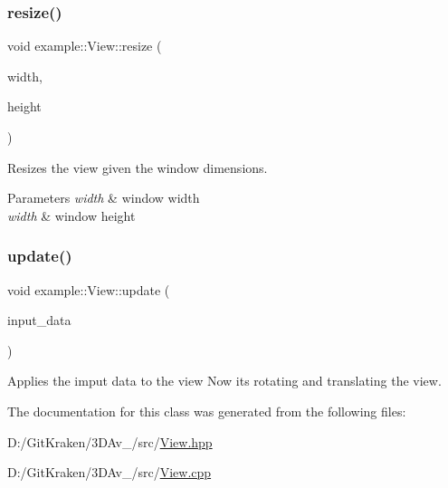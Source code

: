\mbox{\label{classoglsl_1_1_view_a2396337a1db393acefb174e386cde7d1}} 
\subsubsection{\texorpdfstring{resize()}{resize()}}
{\footnotesize\ttfamily void example\+::\+View\+::resize (\begin{DoxyParamCaption}\item[{int}]{width,  }\item[{int}]{height }\end{DoxyParamCaption})}



Resizes the view given the window dimensions. 


\begin{DoxyParams}{Parameters}
{\em width} & window width \\
\hline
{\em width} & window height \\
\hline
\end{DoxyParams}
\mbox{\label{classoglsl_1_1_view_ac0b18fc4d2abe1abca6940c55313ef3b}} 
\subsubsection{\texorpdfstring{update()}{update()}}
{\footnotesize\ttfamily void example\+::\+View\+::update (\begin{DoxyParamCaption}\item[{\mbox{\hyperlink{classoglsl_1_1_input_a3b21d7328538e661f366af5d6059c197}{Input\+::\+Input\+Data}}}]{input\+\_\+data }\end{DoxyParamCaption})}



Applies the imput data to the view Now it\textquotesingle{}s rotating and translating the view. 



The documentation for this class was generated from the following files\+:\begin{DoxyCompactItemize}
\item 
D\+:/\+Git\+Kraken/3\+D\+Av\+\_/src/\mbox{\hyperlink{_view_8hpp}{View.\+hpp}}\item 
D\+:/\+Git\+Kraken/3\+D\+Av\+\_/src/\mbox{\hyperlink{_view_8cpp}{View.\+cpp}}\end{DoxyCompactItemize}
